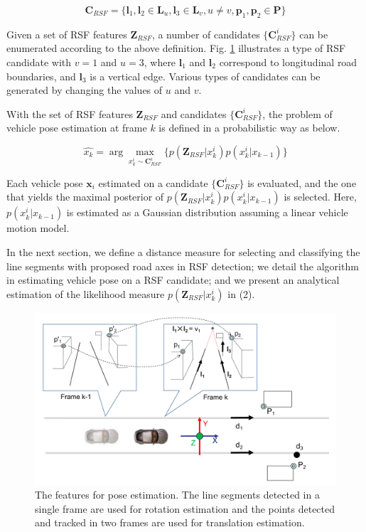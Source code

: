 \documentclass[letterpaper, 10 pt, conference]{ieeeconf}  %
\begin{document}
\begin{equation}
\mathbf{C}_{RSF}=\{\mathbf{l}_1,\mathbf{l}_2\in \mathbf{L}_u, \mathbf{l}_3\in \mathbf{L}_v, u \neq v, \mathbf{p}_1,\mathbf{p}_2\in \mathbf{P}\}
\label{eq:C_RSF}
\end{equation}

Given a set of RSF features $\mathbf{Z}_{RSF}$, a number of candidates $\{\mathbf{C}_{RSF}^i\}$ can be enumerated according to the above definition. Fig. \ref{fig:features_for_estimation} illustrates a type of RSF candidate with $v=1$ and $u=3$, where $\mathbf{l}_1$ and $\mathbf{l}_2$ correspond to longitudinal road boundaries, and $\mathbf{l}_3$ is a vertical edge. Various types of candidates can be generated by changing the values of $u$ and $v$.

With the set of RSF features $\mathbf{Z}_{RSF}$ and candidates $\{\mathbf{C}_{RSF}^i\}$, the problem of vehicle pose estimation at frame $k$ is defined in a probabilistic way as below.

\begin{equation}
\hat{x_k} = \displaystyle \arg\max _{x_k^i \sim \mathbf{C}_{RSF}^i} \{ p(\mathbf{Z}_{RSF} | x_k^i) p(x_k^i|x_{k-1}) \}
\end{equation}

Each vehicle pose $\mathbf{x}_i$ estimated on a candidate $\{\mathbf{C}_{RSF}^i\}$ is evaluated, and the one that yields the maximal posterior of $p(\mathbf{Z}_{RSF} | x_k^i) p(x_k^i|x_{k-1})$ is selected. Here, $p(x_k^i|x_{k-1})$ is estimated as a Gaussian distribution assuming a linear vehicle motion model.

In the next section, we define a distance measure for selecting and classifying the line segments with proposed road axes in RSF detection; we detail the algorithm in estimating vehicle pose on a RSF candidate; and we present an analytical estimation of the likelihood measure $p(\mathbf{Z}_{RSF} | x_k^i)$ in (2).



\begin{figure}
  \centering
  \includegraphics[width=0.9\linewidth]{source//Final//feature.pdf}
  \caption{The features for pose estimation. The line segments detected in a single frame are used for rotation estimation and the points detected and tracked in two frames are used for translation estimation.}
  \label{fig:features_for_estimation}
\end{figure}
\end{document}
